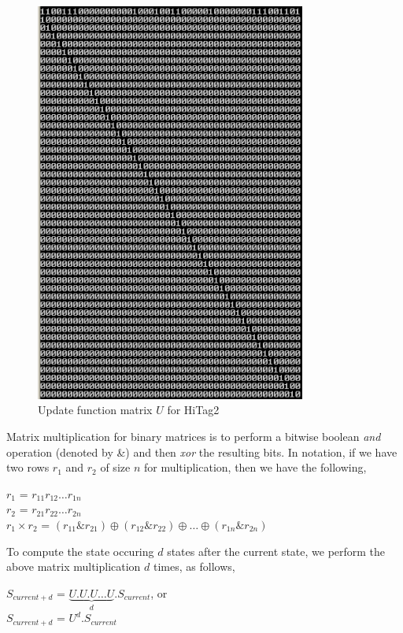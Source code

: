 \begin{figure}[h!]
	\centering
	\includegraphics[width=3.5in]{./figures/hitag2-transition-matrix.png}
	\caption{Update function matrix $U$ for HiTag2}	
	\label{fig:hitag2-transition-matrix}
\end{figure}

Matrix multiplication for binary matrices is to perform a bitwise boolean \emph{and} operation (denoted by \&) and then \emph{xor} the resulting bits. In notation, if we have two rows $r_1$ and $r_2$ of size $n$ for multiplication, then we have the following,

\begin{center}
\large{$r_1$ = $r_{11} r_{12} \ldots r_{1n}$}\\
\large{$r_2$ = $r_{21} r_{22} \ldots r_{2n}$}\\
\large{$r_1 \times r_2$ = $(r_{11} \& r_{21}) \oplus (r_{12} \& r_{22}) \oplus \ldots \oplus (r_{1n} \& r_{2n})$}
\end{center}

To compute the state occuring $d$ states after the current state, we perform the above matrix multiplication $d$ times, as follows,

\begin{center}
\large{$S_{current + d}$ = $\underbrace{U . U . U \dots U}_{d} . S_{current}$}, or\\
\large{$S_{current + d}$ = $U^d . S_{current}$}\\
\end{center}

